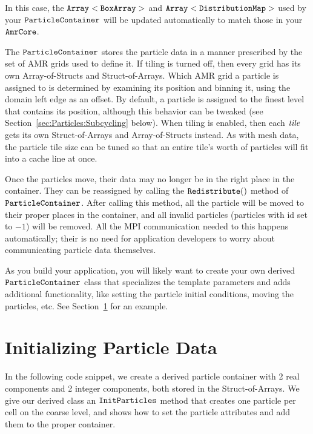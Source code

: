 In this case, the $\tt{Array<BoxArray>}$ and $\tt{Array<DistributionMap>}$ used by your $\tt{ParticleContainer}$ will be updated automatically to match those in
your $\tt{AmrCore}$. 

The $\tt{ParticleContainer}$ stores the particle data in a manner prescribed by the set of AMR grids used to define it. If tiling is turned off, then every grid has its own 
Array-of-Structs and Struct-of-Arrays. Which AMR grid a particle is assigned to is determined by examining its position and binning it, using the domain left edge as an offset. 
By default, a particle is assigned to the finest level that contains its position, although this behavior can be tweaked (see Section~\ref{sec:Particles:Subcycling} below). 
When tiling is enabled, then each $\emph{tile}$ gets its own Struct-of-Arrays and Array-of-Structs instead. As with mesh data, the particle tile size can be tuned so that an 
entire tile's worth of particles will fit into a cache line at once.

Once the particles move, their data may no longer be in the right place in the container. They can be reassigned by calling the $\tt{Redistribute()}$ method of $\tt{ParticleContainer}$.
After calling this method, all the particle will be moved to their proper places in the container, and all invalid particles (particles with id set to $-1$) will be removed. All the 
MPI communication needed to this happens automatically; their is no need for application developers to worry about communicating particle data themselves.

As you build your application, you will likely want to create your own derived $\tt{ParticleContainer}$ class that specializes the template parameters and adds additional 
functionality, like setting the particle initial conditions, moving the particles, etc. See Section~\ref{sec:Particles:Initializing} for an example.

\section{Initializing Particle Data}
\label{sec:Particles:Initializing}

In the following code snippet, we create a derived particle container with 2 real components and 2 integer components, both stored in the Struct-of-Arrays.
We give our derived class an $\tt{InitParticles}$ method that creates one particle per cell on the coarse level, and shows how to set the particle attributes
and add them to the proper container. 

